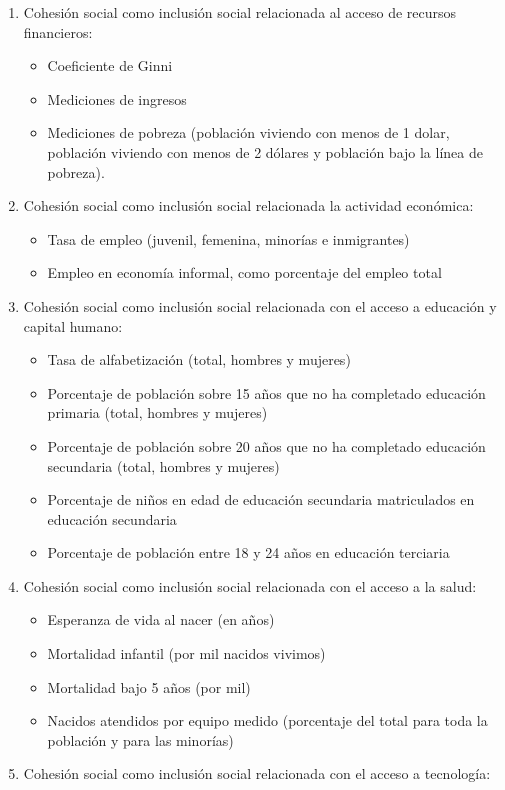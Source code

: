 \documentclass[
  12pt,
]{book}
\begin{document}
\begin{enumerate}
\def\labelenumi{\arabic{enumi}.}
\item
  Cohesión social como inclusión social relacionada al acceso de
  recursos financieros:

  \begin{itemize}
  \item
    Coeficiente de Ginni
  \item
    Mediciones de ingresos
  \item
    Mediciones de pobreza (población viviendo con menos de 1 dolar,
    población viviendo con menos de 2 dólares y población bajo la
    línea de pobreza).
  \end{itemize}
\item
  Cohesión social como inclusión social relacionada la actividad
  económica:

  \begin{itemize}
  \item
    Tasa de empleo (juvenil, femenina, minorías e inmigrantes)
  \item
    Empleo en economía informal, como porcentaje del empleo total
  \end{itemize}
\item
  Cohesión social como inclusión social relacionada con el acceso a
  educación y capital humano:

  \begin{itemize}
  \item
    Tasa de alfabetización (total, hombres y mujeres)
  \item
    Porcentaje de población sobre 15 años que no ha completado
    educación primaria (total, hombres y mujeres)
  \item
    Porcentaje de población sobre 20 años que no ha completado
    educación secundaria (total, hombres y mujeres)
  \item
    Porcentaje de niños en edad de educación secundaria matriculados
    en educación secundaria
  \item
    Porcentaje de población entre 18 y 24 años en educación
    terciaria
  \end{itemize}
\item
  Cohesión social como inclusión social relacionada con el acceso a la
  salud:

  \begin{itemize}
  \item
    Esperanza de vida al nacer (en años)
  \item
    Mortalidad infantil (por mil nacidos vivimos)
  \item
    Mortalidad bajo 5 años (por mil)
  \item
    Nacidos atendidos por equipo medido (porcentaje del total para
    toda la población y para las minorías)
  \end{itemize}
\item
  Cohesión social como inclusión social relacionada con el acceso a
  tecnología:


\end{enumerate}
\end{document}
